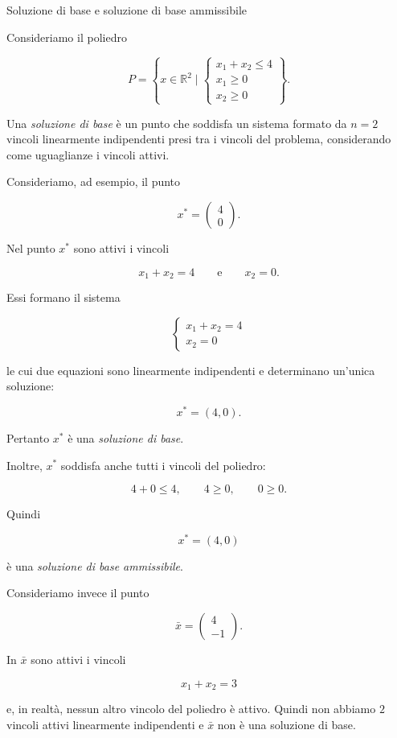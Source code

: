 \begin{example}{Soluzione di base e soluzione di base ammissibile}

Consideriamo il poliedro

$$
P = \left\{x \in \mathbb{R}^2 \mid
\begin{cases}
x_1 + x_2 \leq 4\\
x_1 \geq 0\\
x_2 \geq 0
\end{cases}
\right\}.
$$

Una \emph{soluzione di base} è un punto che soddisfa un sistema formato da $n=2$ vincoli linearmente indipendenti presi tra i vincoli del problema, considerando come uguaglianze i vincoli attivi.

\medskip

Consideriamo, ad esempio, il punto

$$
x^* =
\begin{pmatrix}
4\\
0
\end{pmatrix}.
$$

Nel punto $x^*$ sono attivi i vincoli

$$
x_1+x_2=4
\qquad\text{e}\qquad
x_2=0.
$$

Essi formano il sistema

$$
\begin{cases}
x_1+x_2=4\\
x_2=0
\end{cases}
$$

le cui due equazioni sono linearmente indipendenti e determinano un'unica soluzione:

$$
x^*=(4,0).
$$

Pertanto $x^*$ è una \emph{soluzione di base}.

Inoltre, $x^*$ soddisfa anche tutti i vincoli del poliedro:

$$
4+0\leq4,\qquad 4\geq0,\qquad 0\geq0.
$$

Quindi

$$
x^*=(4,0)
$$

è una \emph{soluzione di base ammissibile}.

\medskip

Consideriamo invece il punto

$$
\bar{x}=
\begin{pmatrix}
4\\
-1
\end{pmatrix}.
$$

In $\bar{x}$ sono attivi i vincoli

$$
x_1+x_2=3
$$

e, in realtà, nessun altro vincolo del poliedro è attivo. Quindi non abbiamo $2$ vincoli attivi linearmente indipendenti e $\bar{x}$ non è una soluzione di base.
\end{example}

